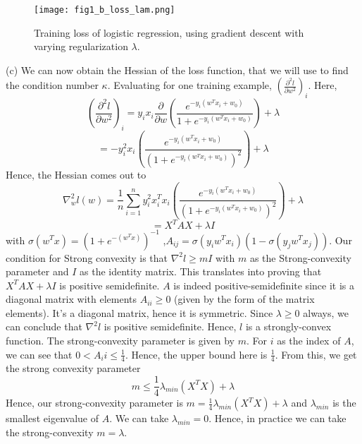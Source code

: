 \documentclass[12pt]{article}
\begin{document}
\begin{figure}[h!]
\texttt{[image: fig1\_b\_loss\_lam.png]}
\caption{Training loss of logistic regression, using gradient descent with varying regularization $\lambda$. } 
\centering
\end{figure}

(c) We can now obtain the Hessian of the loss function, that we will use to find the condition number $\kappa$. Evaluating for one training example, $ ( \frac{\partial^{2}  l }{ \partial w^{2}  }  )_{i}  $. Here, 
$$ ( \frac{\partial^{2}  l }{ \partial w^{2}  } )_{i}  = y_{i} x_{i}   \frac{\partial  }{ \partial w }  (\frac{e^{-y_{i} (w^{T} x_{i} + w_{0} ) }  }{1+ e^{-y_{i} (w^{T} x_{i} + w_{0} ) } }  )  + \lambda  $$     
$$ =-  y_{i}^{2}  x_{i}( \frac{e^{ -y_{i} ( w^{T} x_{i} + w_{0}   )  }  }{(1+ e^{-y_{i}  ( w^{T} x_{i} + w_{0}   ) }   )^{2}   }   ) + \lambda     $$
Hence, the Hessian comes out to
$$ \nabla_{w}^{2}  l (w)  =    \frac{1}{n}  \sum_{i=1}^{n} y_{i}^{2}  x_{i}^{T} x_{i}( \frac{e^{ -y_{i} ( w^{T} x_{i} + w_{0}   )  }  }{(1+ e^{-y_{i}  ( w^{T} x_{i} + w_{0}   ) }   )^{2}   }   )  + \lambda    $$
$$ = X^{T} A X + \lambda I $$
with $\sigma (w^{T} x)  = (1 + e^{- (w^{T} x ) }  )^{-1} $ ,$A_{ij} = \sigma(y_{i}w^{T} x_{i}  ) (1 - \sigma(y_{j}w^{T} x_{j}  ) ) $.  Our condition for Strong convexity is that $\nabla^{2}  l \geq m I $ with $m$ as the Strong-convexity parameter and $I$ as the identity matrix. This translates into proving that $X^{T} A X  +  \lambda I $ is positive semidefinite. $A$ is indeed positive-semidefinite since it is a diagonal matrix with elements $A_{ii} \geq 0$ (given by the form of the matrix elements). It's a diagonal matrix, hence it is symmetric. Since $\lambda \geq 0$ always, we can conclude that $\nabla^{2} l $ is positive semidefinite. Hence, $l$ is a strongly-convex function. The strong-convexity parameter is given by $m$. For $i$ as the index of $A$, we can see that $0 < A_{i} i \leq \frac{1}{4}$.  Hence, the upper bound here is $\frac{1}{4}$. From this, we get the strong convexity parameter 
$$m \leq \frac{1}{4} \lambda_{min}  (X^{T} X)  + \lambda $$
Hence, our strong-convexity parameter is $m =  \frac{1}{4}  \lambda_{min}  (X^{T} X)  + \lambda $ and $\lambda_{min}$ is the smallest eigenvalue of $A$. We can take $\lambda_{min} = 0$. Hence, in practice we can take the strong-convexity $m = \lambda$.  \newline  \newline 
\end{document}
